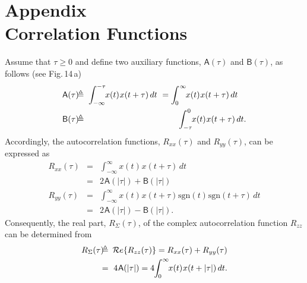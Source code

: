 \documentclass[journal]{IEEEtran}
\begin{document}
\section*{Appendix\\	Correlation Functions}
 Assume that $\tau \ge 0$ and define two auxiliary functions, $\mathsf{A}(\tau)$ and $\mathsf{B}(\tau)$, as follows (see Fig.\,14\,a)
\begin{eqnarray}
	\mathsf{A}(\tau) \mspace{-8mu}&\triangleq&\mspace{-8mu} \int_{-\infty}^{-\tau} \mspace{-5mu}
	x(t)\mspace{1mu} x(t+\tau) \, dt \,\,
	= \int_{\mspace{-1mu}0}^{\mspace{1mu}\infty} \mspace{-5mu}
	x(t)\mspace{1mu} x(t+\tau) \, dt \nonumber \quad \\
	\mathsf{B}(\tau) \mspace{-8mu}&\triangleq&\mspace{-8mu} \int_{-\tau}^{\mspace{1mu}0} \mspace{-5mu}
	x(t)\mspace{1mu} x(t+\tau) \, dt.
	\nonumber 
\end{eqnarray} 
Accordingly, the autocorrelation functions, $R_{xx}(\tau)$ and $R_{yy}(\tau)$, can be expressed as
\begin{eqnarray}
	R_{xx}(\tau)\!\! &\!\!=\!\!& \! 
	\int_{-\infty}^{\infty}\!\!
	x(t)\mspace{1mu} x(t+\tau) \, dt 	\nonumber\\
	&\!\!=\!\!& 2\mspace{1mu} \mathsf{A}(|\tau|) + \mathsf{B}(|\tau|)\nonumber\\
	R_{yy}(\tau)\!\! &\!\!=\!\!& \! 
		\int_{-\infty}^{\infty}\!\!
	x(t)\mspace{1mu} x(t+\tau)\mspace{1mu}
	\mathrm{sgn}(t)\mspace{1mu} \mathrm{sgn}(t+\tau) \, dt \nonumber\\
	&\!\!=\!\!& 2\mspace{1mu} \mathsf{A}(|\tau|) - \mathsf{B}(|\tau|).\nonumber
\end{eqnarray}
Consequently, the real part, $R_\Sigma(\tau)$, of the complex autocorrelation function $R_{zz}$ can be determined from
\begin{eqnarray}
	R_\Sigma(\tau)\! &\!\!\triangleq\!\!& \!
	\mathcal{R}e\{R_{zz}(\tau)\}
	= R_{xx}(\tau)+ R_{yy}(\tau)
	\nonumber\\
	\!\! &\!\!=\!\!& \! 4\mspace{1mu} \mathsf{A}(|\tau|) =
		 4\mspace{-4mu} 	\int_{\mspace{-1mu}0}^{\infty} \mspace{-5mu}
	x(t)\mspace{1mu} x(t+|\tau|) \, dt. 
\end{eqnarray}
\end{document}
